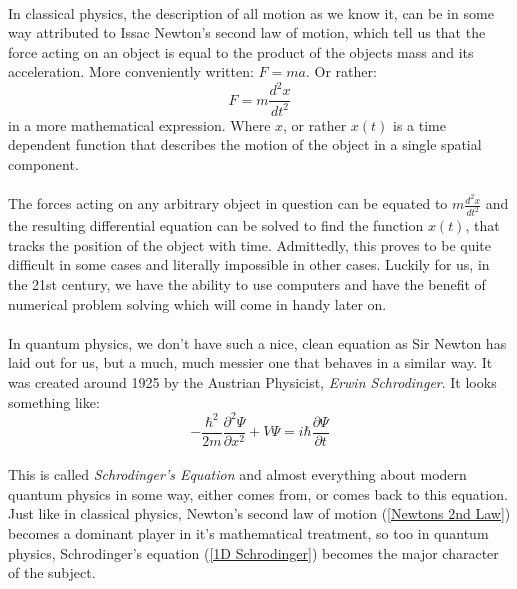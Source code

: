 \documentclass[12pt,letterpaper]{book}
\begin{document}
\paragraph*{}In classical physics, the description of all motion as we know it, can be in some way attributed to Issac Newton's second law of motion, which tell us that the force acting on an object is equal to the product of the objects mass and its acceleration. More conveniently written: $F = ma$. Or rather:
\begin{equation}
\label{Newtons 2nd Law}
F = m\frac{d^2x}{dt^2}
\end{equation} 
in a more mathematical expression. Where $x$, or rather $x(t)$ is a time dependent function that describes the motion of the object in a single spatial component.
\paragraph*{}The forces acting on any arbitrary object in question can be equated to $m\frac{d^2x}{dt^2}$ and the resulting differential equation can be solved to find the function $x(t)$, that tracks the position of the object with time. Admittedly, this proves to be quite difficult in some cases and literally impossible in other cases. Luckily for us, in the 21st century, we have the ability to use computers and have the benefit of numerical problem solving which will come in handy later on.
\paragraph*{}In quantum physics, we don't have such a nice, clean equation as Sir Newton has laid out for us, but a much, much messier one that behaves in a similar way. It was created around 1925 by the Austrian Physicist, \textit{Erwin Schrodinger}. It looks something like:
\begin{equation}
\label{1D Schrodinger}
-\frac{\hbar^2}{2m}\frac{\partial^2\Psi}{\partial x^2} +
V\Psi = i\hbar\frac{\partial \Psi}{\partial t}
\end{equation}
\paragraph*{}This is called \textit{Schrodinger's Equation} and almost everything about modern quantum physics in some way, either comes from, or comes back to this equation. Just like in classical physics, Newton's second law of motion (\ref{Newtons 2nd Law}) becomes a dominant player in it's mathematical treatment, so too in quantum physics, Schrodinger's equation (\ref{1D Schrodinger}) becomes the major character of the subject.
\end{document}
